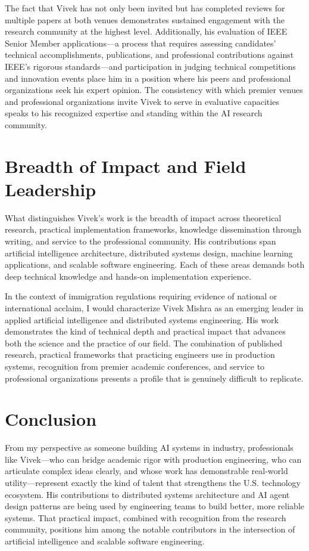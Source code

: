 \documentclass[11pt]{article}
\begin{document}
The fact that Vivek has not only been invited but has completed reviews for multiple papers at both venues demonstrates sustained engagement with the research community at the highest level. Additionally, his evaluation of IEEE Senior Member applications---a process that requires assessing candidates' technical accomplishments, publications, and professional contributions against IEEE's rigorous standards---and participation in judging technical competitions and innovation events place him in a position where his peers and professional organizations seek his expert opinion. The consistency with which premier venues and professional organizations invite Vivek to serve in evaluative capacities speaks to his recognized expertise and standing within the AI research community.



\section*{Breadth of Impact and Field Leadership}

What distinguishes Vivek's work is the breadth of impact across theoretical research, practical implementation frameworks, knowledge dissemination through writing, and service to the professional community. His contributions span artificial intelligence architecture, distributed systems design, machine learning applications, and scalable software engineering. Each of these areas demands both deep technical knowledge and hands-on implementation experience.

In the context of immigration regulations requiring evidence of national or international acclaim, I would characterize Vivek Mishra as an emerging leader in applied artificial intelligence and distributed systems engineering. His work demonstrates the kind of technical depth and practical impact that advances both the science and the practice of our field. The combination of published research, practical frameworks that practicing engineers use in production systems, recognition from premier academic conferences, and service to professional organizations presents a profile that is genuinely difficult to replicate.

\section*{Conclusion}

From my perspective as someone building AI systems in industry, professionals like Vivek---who can bridge academic rigor with production engineering, who can articulate complex ideas clearly, and whose work has demonstrable real-world utility---represent exactly the kind of talent that strengthens the U.S. technology ecosystem. His contributions to distributed systems architecture and AI agent design patterns are being used by engineering teams to build better, more reliable systems. That practical impact, combined with recognition from the research community, positions him among the notable contributors in the intersection of artificial intelligence and scalable software engineering.
\end{document}
